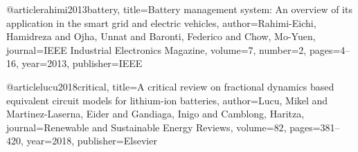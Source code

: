 @article{rahimi2013battery,
  title={Battery management system: An overview of its application in the smart grid and electric vehicles},
  author={Rahimi-Eichi, Hamidreza and Ojha, Unnat and Baronti, Federico and Chow, Mo-Yuen},
  journal={IEEE Industrial Electronics Magazine},
  volume={7},
  number={2},
  pages={4--16},
  year={2013},
  publisher={IEEE}
}

@article{lucu2018critical,
  title={A critical review on fractional dynamics based equivalent circuit models for lithium-ion batteries},
  author={Lucu, Mikel and Martinez-Laserna, Eider and Gandiaga, Inigo and Camblong, Haritza},
  journal={Renewable and Sustainable Energy Reviews},
  volume={82},
  pages={381--420},
  year={2018},
  publisher={Elsevier}
}
